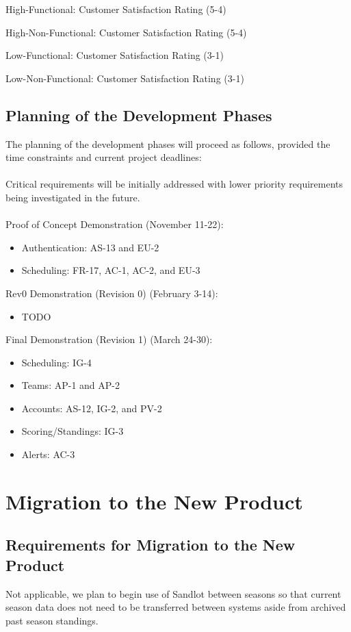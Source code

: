 \documentclass[12pt]{article}
\begin{document}
High-Functional: Customer Satisfaction Rating (5-4)

High-Non-Functional: Customer Satisfaction Rating (5-4)

Low-Functional: Customer Satisfaction Rating (3-1)

Low-Non-Functional: Customer Satisfaction Rating (3-1)

\subsection{Planning of the Development Phases}

The planning of the development phases will proceed as follows, provided the time
constraints and current project deadlines: \\\\
Critical requirements will be initially addressed with lower priority requirements
being investigated in the future. \\\\

Proof of Concept Demonstration (November 11-22):
\begin{itemize}
  \item Authentication: AS-13 and EU-2
  \item Scheduling: FR-17, AC-1, AC-2, and EU-3
\end{itemize}

Rev0 Demonstration (Revision 0) (February 3-14):
\begin{itemize}
  \item TODO
\end{itemize}

Final Demonstration (Revision 1) (March 24-30):
\begin{itemize}
  \item Scheduling: IG-4
  \item Teams: AP-1 and AP-2
  \item Accounts: AS-12, IG-2, and PV-2
  \item Scoring/Standings: IG-3
  \item Alerts: AC-3
\end{itemize}

\section{Migration to the New Product}
\subsection{Requirements for Migration to the New Product}
Not applicable, we plan to begin use of Sandlot between seasons so that
current season data does not need to be transferred between systems aside from
archived past season standings.
\end{document}
